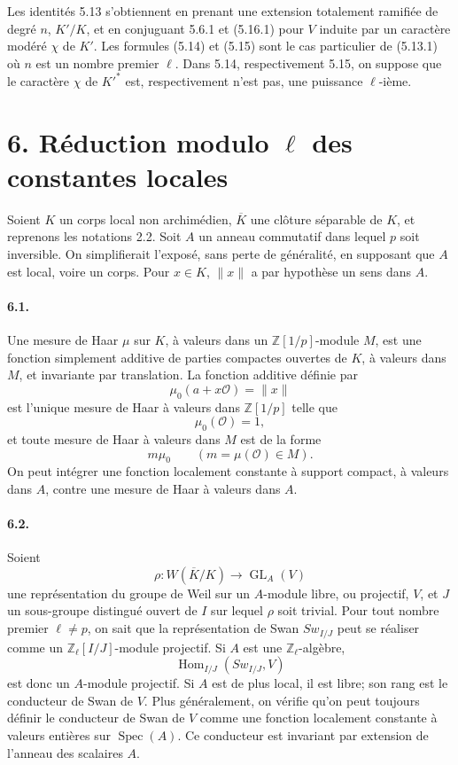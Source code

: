 \documentclass[10pt]{article}
\newcommand{\GL}{\operatorname{GL}}
\newcommand{\Hom}{\operatorname{Hom}}
\newcommand{\Spec}{\operatorname{Spec}}
\providecommand{\Spec}{\operatorname{Spec}}
\providecommand{\Hom}{\operatorname{Hom}}
\providecommand{\GL}{\operatorname{GL}}
\providecommand{\GL}{\operatorname{GL}}
\providecommand{\Hom}{\operatorname{Hom}}
\providecommand{\Spec}{\operatorname{Spec}}
\providecommand{\Spec}{\operatorname{Spec}}
\providecommand{\Hom}{\operatorname{Hom}}
\begin{document}
Les identités 5.13 s'obtiennent en prenant une extension totalement ramifiée de degré \(n\), \(K'/K\), et en conjuguant 5.6.1 et (5.16.1) pour \(V\) induite par un caractère modéré \(\chi\) de \(K'\). Les formules (5.14) et (5.15) sont le cas particulier de (5.13.1) où \(n\) est un nombre premier \(\ell\). Dans 5.14, respectivement 5.15, on suppose que le caractère \(\chi\) de \(K'^*\) est, respectivement n'est pas, une puissance \(\ell\)-ième.

\section*{6. Réduction modulo \(\ell\) des constantes locales}

Soient \(K\) un corps local non archimédien, \(\overline K\) une clôture séparable de \(K\), et reprenons les notations 2.2. Soit \(A\) un anneau commutatif dans lequel \(p\) soit inversible. On simplifierait l'exposé, sans perte de généralité, en supposant que \(A\) est local, voire un corps. Pour \(x\in K\), \(\|x\|\) a par hypothèse un sens dans \(A\).

\paragraph{6.1.} Une mesure de Haar \(\mu\) sur \(K\), à valeurs dans un \(\mathbb Z[1/p]\)-module \(M\), est une fonction simplement additive de parties compactes ouvertes de \(K\), à valeurs dans \(M\), et invariante par translation. La fonction additive définie par
\[
\mu_0(a+x\mathcal O)=\|x\|
\]
est l'unique mesure de Haar à valeurs dans \(\mathbb Z[1/p]\) telle que
\[
\mu_0(\mathcal O)=1,
\]
et toute mesure de Haar à valeurs dans \(M\) est de la forme
\[
m\mu_0\qquad(m=\mu(\mathcal O)\in M).
\]
On peut intégrer une fonction localement constante à support compact, à valeurs dans \(A\), contre une mesure de Haar à valeurs dans \(A\).

\paragraph{6.2.} Soient
\[
\rho:W(\overline K/K)\longrightarrow\GL_A(V)
\]
une représentation du groupe de Weil sur un \(A\)-module libre, ou projectif, \(V\), et \(J\) un sous-groupe distingué ouvert de \(I\) sur lequel \(\rho\) soit trivial. Pour tout nombre premier \(\ell\ne p\), on sait que la représentation de Swan \(Sw_{I/J}\) peut se réaliser comme un \(\mathbb Z_\ell[I/J]\)-module projectif. Si \(A\) est une \(\mathbb Z_\ell\)-algèbre,
\[
\Hom_{I/J}(Sw_{I/J},V)
\]
est donc un \(A\)-module projectif. Si \(A\) est de plus local, il est libre; son rang est le conducteur de Swan de \(V\). Plus généralement, on vérifie qu'on peut toujours définir le conducteur de Swan de \(V\) comme une fonction localement constante à valeurs entières sur \(\Spec(A)\). Ce conducteur est invariant par extension de l'anneau des scalaires \(A\).
\end{document}
